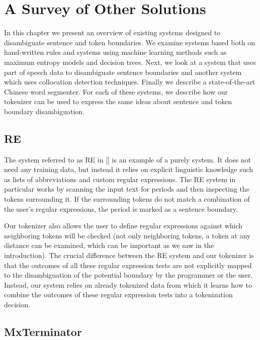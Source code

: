 \chapter{A Survey of Other Solutions}
\label{chap:survey}

In this chapter we present an overview of existing systems designed to
disambiguate sentence and token boundaries. We examine systems based both on
hand-written rules and systems using machine learning methods such as maximum
entropy models and decision trees. Next, we look at a system that uses part of
speech data to disambiguate sentence boundaries and another system which uses
collocation detection techniques. Finally we describe a state-of-the-art
Chinese word segmenter. For each of these systems, we describe how our
tokenizer can be used to express the same ideas about sentence and token
boundary disambiguation.

\section{RE}
\label{sec:survey-re}

The system referred to as RE in [] is an example of a purely
 system. It does not need any training data, but instead it
relies on explicit linguistic knowledge such as lists of abbreviations and
custom regular expressions. The RE system in particular works by scanning the
input text for periods and then inspecting the tokens surrounding it. If the
surrounding tokens do not match a combination of the user's regular
expressions, the period is marked as a sentence boundary.

Our tokenizer also allows the user to define regular expressions against which
neighboring tokens will be checked (not only neighboring tokens, a token at any
distance can be examined, which can be important as we saw in the
introduction). The crucial difference between the RE system and our tokenizer
is that the outcomes of all these regular expression tests are not explicitly
mapped to the disambiguation of the potential boundary by the programmer or the
user. Instead, our system relies on already tokenized data from which it learns
how to combine the outcomes of these regular expression tests into a
tokenization decision.

\section{MxTerminator\cite{Ratnaparkhi-MxTerm}}
\label{sec:survey-mxterm}

